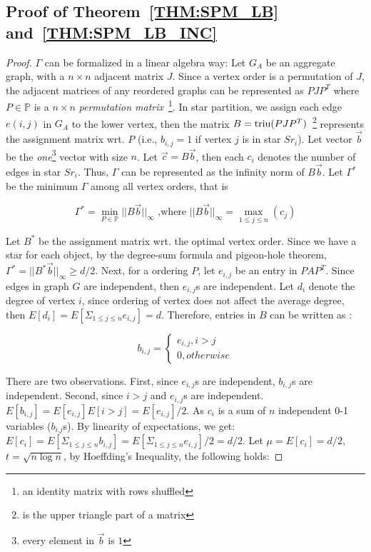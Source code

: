 \subsection{Proof of Theorem~\ref{THM:SPM_LB} and~\ref{THM:SPM_LB_INC}}
\label{apx:thm2proof}
\begin{proof}
$\Gamma$ can be formalized in a linear algebra way:
Let $G_A$ be an aggregate graph, with a $n \times n$ adjacent matrix $J$.
Since a vertex order is a permutation of $J$, the adjacent matrices 
of any reordered graphs can be represented as $PJP^T$
where $P \in \mathbb{P}$ is a $n\times n$ \emph{permutation matrix}~\footnote{an identity matrix with rows shuffled}.
In star partition, we assign each edge $e(i,j)$ in $G_A$ to the lower vertex, 
then the matrix $B=\operatorname*{triu}(PJP^T)$~\footnote{ is the upper triangle part of a matrix}
represents the assignment matrix wrt. $P$ (i.e., $b_{i,j} = 1$ if vertex $j$ is in star $Sr_i$).
Let vector $\vec{b}$ be the \textit{one}\footnote{every element in $\vec{b}$ is $1$} 
vector with size $n$. Let $\vec{c} = B\vec{b}$, then each $c_i$ 
denotes the number of edges in star $Sr_i$. Thus, $\Gamma$ can be represented
as the infinity norm of $B\vec{b}$. Let $\Gamma^*$ be the minimum $\Gamma$ among all vertex orders, that is

\begin{equation}
\Gamma^* = \min_{P \in \mathbb{P}}{||B\vec{b}||_\infty} \text{ ,where } ||B\vec{b}||_\infty = \max_{1\leq j \leq n}(c_j)
\end{equation}

Let $B^*$ be the assignment matrix wrt. the optimal vertex order.
Since we have a star for each object, by the degree-sum formula and pigeon-hole theorem, 
$\Gamma^*=||B^*\vec{b}||_\infty \geq d/2$.
Next, for a ordering $P$, let $e_{i,j}$ be an entry in $PAP^T$. Since 
edges in graph $G$ are independent, then $e_{i,j}$s are independent. 
Let $d_i$ denote the degree of vertex $i$, since ordering of vertex does not
affect the average degree,
then $E[d_i]=E[\Sigma_{1\leq j \leq n}e_{i,j}]=d$. Therefore, 
entries in $B$ can be written as :

\begin{equation*}
b_{i,j} = \begin{cases}
			e_{i,j}, i>j \\
			0, otherwise
		  \end{cases}  
\end{equation*}

There are two observations. First, since $e_{i,j}$s are independent,
$b_{i,j}$s are independent. Second, since $i>j$ and $e_{i,j}$s are independent. 
$E[b_{i,j}] = E[e_{i,j}]E[i>j]= E[e_{i,j}]/2$.
As $c_i$ is a sum of $n$ independent 0-1 variables ($b_{i.j}$s). By linearity 
of expectations,
we get: $E[c_i] = E[\Sigma_{1\leq j \leq n} b_{i,j}]=E[\Sigma_{1\leq j \leq n} e_{i,j}]/2 = d/2$.
 Let $\mu =E[c_i] = d/2$, 
$t = \sqrt{n\log n}$, by Hoeffding's Inequality, the following holds:


\end{proof}
